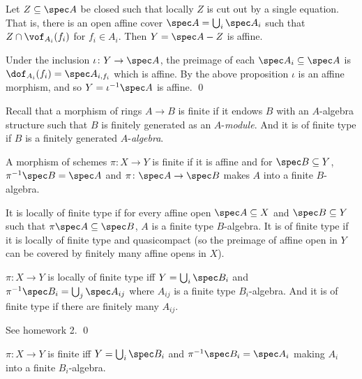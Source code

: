 \eproof

\bcoro

    Let $Z\subseteq\spec A$ be closed such that locally $Z$ is cut out by a single equation.
    That is, there is an open affine cover $\spec A=\bigcup_i\spec A_i$ such that $Z\cap\vof_{A_i}(f_i)$ for $f_i\in A_i$.
    Then $Y=\spec A-Z$ is affine.

\ecoro

\bproof

    Under the inclusion $\iota\colon Y\to\spec A$, the preimage of each $\spec A_i\subseteq\spec A$ is $\dof_{A_i}(f_i)=\spec A_{i,f_i}$ which is affine.
    By the above proposition $\iota$ is an affine morphism, and so $Y=\iota^{-1}\spec A$ is affine.
    \qed

\eproof

Recall that a morphism of rings $A\to B$ is {\emphcolor finite} if it endows $B$ with an $A$-algebra structure such that $B$ is finitely generated as an $A$-{\it module}.
And it is of {\emphcolor finite type} if $B$ is a finitely generated $A$-{\it algebra}.

\bdefn

    A morphism of schemes $\pi\colon X\to Y$ is {\emphcolor finite} if it is affine and for $\spec B\subseteq Y$, $\pi^{-1}\spec B=\spec A$
    and $\pi\colon\spec A\to\spec B$ makes $A$ into a finite $B$-algebra.

    It is {\emphcolor locally of finite type} if for every affine open $\spec A\subseteq X$ and $\spec B\subseteq Y$ such that $\pi\spec A\subseteq\spec B$,
    $A$ is a finite type $B$-algebra.
    It is {\emphcolor of finite type} if it is locally of finite type and quasicompact (so the preimage of affine open in $Y$ can be covered by finitely many
    affine opens in $X$).

\edefn

\bprop

    $\pi\colon X\to Y$ is locally of finite type iff $Y=\bigcup_i\spec B_i$ and $\pi^{-1}\spec B_i=\bigcup_j\spec A_{ij}$ where $A_{ij}$ is a finite type $B_i$-algebra.
    And it is of finite type if there are finitely many $A_{ij}$.

\eprop

\bproof

    See homework 2.
    \qed

\eproof

\bprop

    $\pi\colon X\to Y$ is finite iff $Y=\bigcup_i\spec B_i$ and $\pi^{-1}\spec B_i=\spec A_i$ making $A_i$ into a finite $B_i$-algebra.


